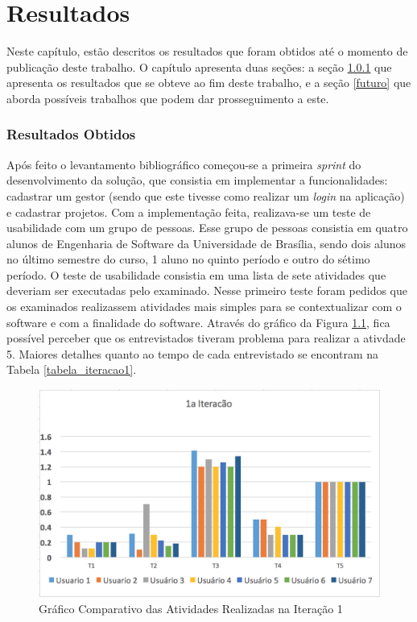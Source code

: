 \chapter[Resultados]{Resultados}
\label{sec:resultados}
Neste capítulo, estão descritos os resultados que foram obtidos até o momento de publicação deste trabalho. O capítulo apresenta duas seções: a seção \ref{resultados_obtidos} que apresenta os resultados que se obteve ao fim deste trabalho, e a seção \ref{futuro} que aborda possíveis trabalhos que podem dar prosseguimento a este.

\subsection{Resultados Obtidos}
\label{resultados_obtidos}

Após feito o levantamento bibliográfico começou-se a primeira \textit{sprint} do desenvolvimento da solução, que consistia em implementar a funcionalidades: cadastrar um gestor (sendo que este tivesse como realizar um \textit{login} na aplicação) e cadastrar projetos. Com a implementação feita, realizava-se um teste de usabilidade com um grupo de pessoas. Esse grupo de pessoas consistia em quatro alunos de Engenharia de Software da Universidade de Brasília, sendo dois alunos no último semestre do curso, 1 aluno no quinto período e outro do sétimo período. O teste de usabilidade consistia em uma lista de sete atividades que deveriam ser executadas pelo examinado. Nesse primeiro teste foram pedidos que os examinados realizassem atividades mais simples para se contextualizar com o software e com a finalidade do software. Através do gráfico da Figura \ref{img:grafico_iteracao1}, fica possível perceber que os entrevistados tiveram problema para realizar a ativdade 5. Maiores detalhes quanto ao tempo de cada entrevistado se encontram na Tabela \ref{tabela_iteracao1}.

\graphicspath{{figuras/}}
\begin{figure}[!h]
\centering
\includegraphics[scale=0.75]{iteracao1_grafico}
\caption{Gráfico Comparativo das Atividades Realizadas na Iteração 1}
\label{img:grafico_iteracao1}
\end{figure}

